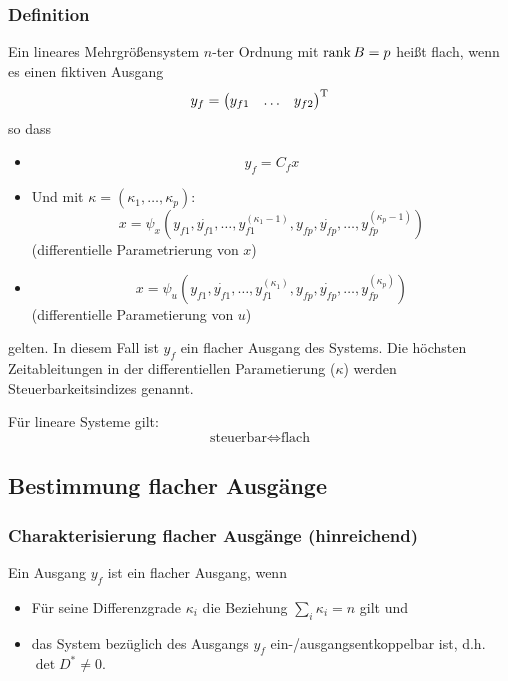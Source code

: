 \subsubsection{Definition}
Ein lineares Mehrgrößensystem $n$-ter Ordnung
\sy
mit $\operatorname*{rank} B = p$ heißt flach, wenn es einen fiktiven Ausgang
\begin{equation}
    y_f = {\begin{pmatrix} y_{f1} & \ldots & y_{f2} \end{pmatrix}}^\text{T}
\end{equation}
so dass
\begin{itemize}
    \item
        \begin{equation}
            y_f = C_f x
        \end{equation}
    \item Und mit $\kappa = (\kappa_1, \ldots, \kappa_p)$:
        \begin{equation}
            x = \psi_x(y_{f1}, \dot{y_{f1}}, \ldots, y_{f1}^{(\kappa_1-1)},
                 y_{fp}, \dot{y_{fp}}, \ldots, y_{fp}^{(\kappa_p-1)})
        \end{equation}
        (differentielle Parametrierung von $x$)
    \item
        \begin{equation}
            x = \psi_u(y_{f1}, \dot{y_{f1}}, \ldots, y_{f1}^{(\kappa_1)},
                 y_{fp}, \dot{y_{fp}}, \ldots, y_{fp}^{(\kappa_p)})
        \end{equation}
        (differentielle Parametierung von $u$) 
\end{itemize}
gelten. In diesem Fall ist $y_f$ ein flacher Ausgang des Systems.
Die höchsten Zeitableitungen in der differentiellen Parametierung ($\kappa$) werden
Steuerbarkeitsindizes genannt.

Für lineare Systeme gilt:
\begin{equation}
    \text{steuerbar} \Leftrightarrow \text{flach}
\end{equation}

\subsection{Bestimmung flacher Ausgänge}
\subsubsection{Charakterisierung flacher Ausgänge (hinreichend)}
Ein Ausgang $y_f$ ist ein flacher Ausgang, wenn
\begin{itemize}
    \item Für seine Differenzgrade $\kappa_i$ die Beziehung $\sum_i \kappa_i = n$ gilt und
    \item das System bezüglich des Ausgangs $y_f$ ein-/ausgangsentkoppelbar ist, d.h.
        $\det D^* \neq 0$.
\end{itemize}

